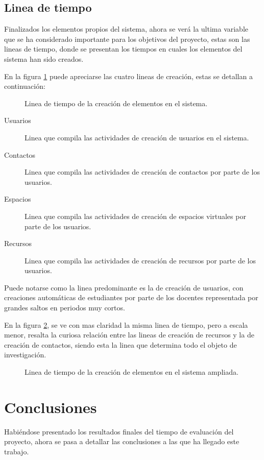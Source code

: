 \subsection{Linea de tiempo}
Finalizados los elementos propios del sistema, ahora se verá la ultima variable
que se ha considerado importante para los objetivos del proyecto, estas son las
lineas de tiempo, donde se presentan los tiempos en cuales los elementos del
sistema han sido creados.

En la figura \ref{tiempos_area_1} puede apreciarse las cuatro lineas de
creación, estas se detallan a continuación:

\begin{figure}
\centering

\caption{Linea de tiempo de la creación de elementos en el sistema.}
\label{tiempos_area_1}
\end{figure}

\begin{description}
\item [Usuarios] Linea que compila las actividades de creación de usuarios en el
sistema.
\item [Contactos] Linea que compila las actividades de creación de contactos por
parte de los usuarios.
\item [Espacios] Linea que compila las actividades de creación de espacios
virtuales por parte de los usuarios.
\item [Recursos] Linea que compila las actividades de creación de recursos por
parte de los usuarios.
\end{description}

Puede notarse como la linea predominante es la de creación de usuarios, con
creaciones automáticas de estudiantes por parte de los docentes representada por
grandes saltos en periodos muy cortos.

En la figura \ref{tiempos_area_2}, se ve con mas claridad la misma linea de
tiempo, pero a escala menor, resalta la curiosa relación entre las lineas
de creación de recursos y la de creación de contactos, siendo esta la linea que
determina todo el objeto de investigación.

\begin{figure}
\centering

\caption{Linea de tiempo de la creación de elementos en el sistema ampliada.}
\label{tiempos_area_2}
\end{figure}

\section{Conclusiones}
Habiéndose presentado los resultados finales del tiempo de evaluación del
proyecto, ahora se pasa a detallar las conclusiones a las que ha llegado este
trabajo.

